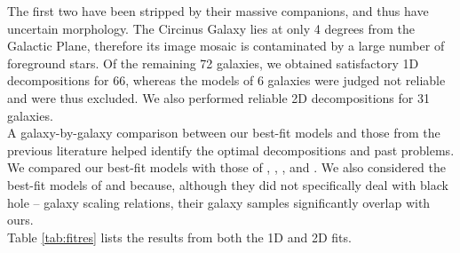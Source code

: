 \documentclass[preprint2]{emulateapj}
\begin{document}
The first two have been stripped by their massive companions, and thus have uncertain morphology. 
The Circinus Galaxy lies at only 4 degrees from the Galactic Plane, 
therefore its image mosaic is contaminated by a large number of foreground stars.
Of the remaining 72 galaxies, 
we obtained satisfactory 1D decompositions for 66, 
whereas the models of 6 galaxies were judged not reliable and were thus excluded. 
We also performed reliable 2D decompositions for 31 galaxies. \\
A galaxy-by-galaxy comparison between our best-fit models and those from the previous literature 
helped identify the optimal decompositions and past problems. 
We compared our best-fit models with those of \cite{grahamdriver2007}, \cite{sani2011}, \cite{beifiori2012}, 
\cite{vika2012} and \cite{lasker2014data}. 
We also considered the best-fit models of \cite{laurikainen2010} and \cite{rusli2013} because,   
although they did not specifically deal with black hole -- galaxy scaling relations, 
their galaxy samples significantly overlap with ours. \\
Table \ref{tab:fitres} lists the results from both the 1D and 2D fits.


\end{document}
